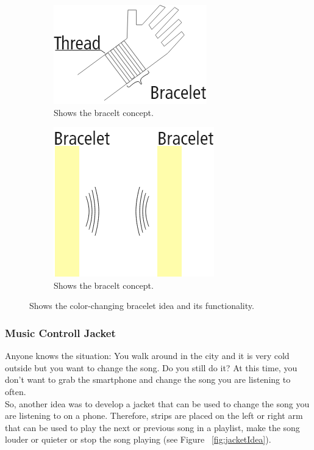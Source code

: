 \documentclass[04_projectProcess.tex]{subfiles}
\begin{document}
    \begin{figure}[H]
        \centering
        \begin{subfigure}{.45\textwidth}
            \centering
            \includegraphics[scale=0.6]{images/projectideas/bracelt_1.png}
            \caption{Shows the bracelt concept.}
            \label{fig:braceltIdea}
            \vspace{6mm}
        \end{subfigure}
        \medskip
        \hspace{1mm}
        \begin{subfigure}{.45\textwidth}
            \centering
            \includegraphics[scale=0.4]{images/projectideas/bracelt_2.png}
            \caption{Shows the bracelt concept.}
            \label{fig:braceltIdea}
            \vspace{6mm}
        \end{subfigure}
        \caption{Shows the color-changing bracelet idea and its functionality.}
        \label{fig:drillingProcess}
    \end{figure}

    \subsubsection{Music Controll Jacket}
    \begin{flushleft}
        Anyone knows the situation: You walk around in the city and it is very cold outside but you want 
        to change the song. Do you still do it? At this time, you don't want to grab the smartphone and 
        change the song you are listening to often. \\
        So, another idea was to develop a jacket that can be used to change the song you are listening to 
        on a phone. Therefore, strips are placed on the left or right arm that can be used to play the 
        next or previous song in a playlist, make the song louder or quieter or stop the song playing 
        (see Figure ~\ref{fig:jacketIdea}).
    \end{flushleft}
\end{document}
